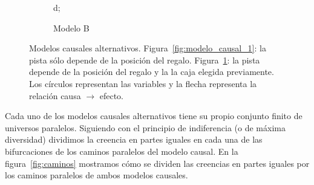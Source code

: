 \documentclass[a4paper,10pt]{book}
\theoremstyle{definition}
\begin{document}
\begin{figure}[ht!]
\begin{subfigure}[b]{0.48\textwidth}
{     {d};
  }
  \caption{Modelo B}
  \label{fig:modelo_causal_2}
  \end{subfigure}
  \caption{Modelos causales alternativos. Figura~\ref{fig:modelo_causal_1}: la pista s\'olo depende de la posici\'on del regalo. Figura~\ref{fig:modelo_causal_2}: la pista depende de la posici\'on del regalo y la la caja elegida previamente.
  Los c\'irculos representan las variables y la flecha representa la relaci\'on causa $\rightarrow$ efecto. 
  }
  \label{fig:modelos_causales}
\end{figure}

% 


Cada uno de los modelos causales alternativos tiene su propio conjunto finito de universos paralelos.
%
Siguiendo con el principio de indiferencia (o de m\'axima diversidad) dividimos la creencia en partes iguales en cada una de las bifurcaciones de los caminos paralelos del modelo causal.
%
En la figura~\ref{fig:caminos} mostramos c\'omo se dividen las creencias en partes iguales por los caminos paralelos de ambos modelos causales.

\end{document}

